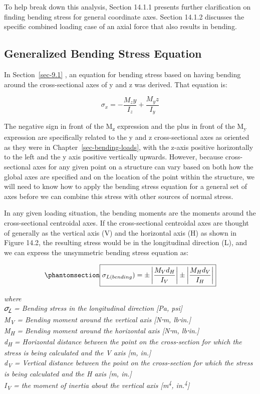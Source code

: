 \documentclass[
  letterpaper,
  DIV=11,
  numbers=noendperiod]{scrreprt}
\theoremstyle{definition}
\theoremstyle{remark}
\begin{document}
To help break down this analysis, Section 14.1.1 presents further
clarification on finding bending stress for general coordinate axes.
Section 14.1.2 discusses the specific combined loading case of an axial
force that also results in bending.

\subsection{Generalized Bending Stress
Equation}\label{generalized-bending-stress-equation}

In Section~\ref{sec-9.1} , an equation for bending stress based on
having bending around the cross-sectional axes of y and z was derived.
That equation is:

\[
\sigma_x=-\frac{M_z y}{I_z}+\frac{M_y z}{I_y}
\]

The negative sign in front of the M\textsubscript{z} expression and the
plus in front of the M\textsubscript{y} expression are specifically
related to the y and z cross-sectional axes as oriented as they were in
Chapter~\ref{sec-bending-loads}, with the z-axis positive horizontally
to the left and the y axis positive vertically upwards. However, because
cross-sectional axes for any given point on a structure can vary based
on both how the global axes are specified and on the location of the
point within the structure, we will need to know how to apply the
bending stress equation for a general set of axes before we can combine
this stress with other sources of normal stress.

In any given loading situation, the bending moments are the moments
around the cross-sectional centroidal axes. If the cross-sectional
centroidal axes are thought of generally as the vertical axis (V) and
the horizontal axis (H) as shown in Figure 14.2, the resulting stress
would be in the longitudinal direction (L), and we can express the
unsymmetric bending stress equation as:

\begin{equation}\phantomsection\label{eq-14.1}{
\boxed{\sigma_{L(bending})= \pm\left|\frac{M_V d_H}{I_V}\right| \pm\left|\frac{M_H d_V}{I_H}\right|}
}\end{equation}

\emph{where}\\
\emph{𝜎\textsubscript{𝐿} = Bending stress in the longitudinal direction
{[}Pa, psi{]}}\\
\emph{M\textsubscript{V} = Bending moment around the vertical axis
{[}N⸱m, lb⸱in.{]}}\\
\emph{M\textsubscript{H} = Bending moment around the horizontal axis
{[}N⸱m, lb⸱in.{]}}\\
\emph{d\textsubscript{H} = Horizontal distance between the point on the
cross-section for which the stress is being calculated and the V axis
{[}m, in.{]}}\\
\emph{d\textsubscript{V} = Vertical distance between the point on the
cross-section for which the stress is being calculated and the H axis
{[}m, in.{]}}\\
\emph{I\textsubscript{V} = the moment of inertia about the vertical axis
{[}m\textsuperscript{4}, in.\textsuperscript{4}{]}}
\end{document}
